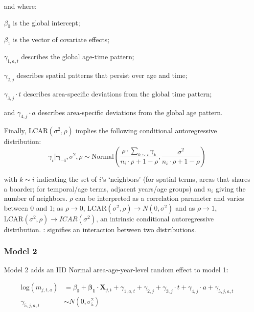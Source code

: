 \documentclass[12pt]{article}
\begin{document}
	and where:
	\begin{description}
		\setlength{\itemsep}{0pt}
		\setlength{\parskip}{0pt}
		\setlength{\parsep}{0pt}
		\setlength{\itemindent}{5pt}
		\setlength{\itemindent}{5pt}
		\item $\beta_0$ is the global intercept;
		\item $\beta_1$ is the vector of covariate effects;
		\item $\gamma_{1,a,t}$ describes the global age-time pattern;
		\item $\gamma_{2,j}$ describes spatial patterns that persist over age and time;
		\item $\gamma_{3,j} \cdot t$ describes area-specific deviations from the global time pattern;
		\item and $\gamma_{4,j} \cdot a$ describes area-specific deviations from the global age pattern.
	\end{description}

	Finally, $\text{LCAR}(\sigma^2, \rho)$ implies the following conditional autoregressive distribution:
	\begin{equation*}
		\gamma_{i} | \boldsymbol{\gamma_{-i}}, \sigma^2, \rho \sim \text{Normal} \left (\frac{\rho \cdot \sum_{k \sim i} \gamma_k}{n_i \cdot \rho+ 1 - \rho}, \frac{\sigma^2}{n_i \cdot \rho + 1 - \rho} \right )
	\end{equation*}

	with $k \sim i$ indicating the set of $i$'s `neighbors' (for spatial terms, areas that shares a boarder; for temporal/age terms, adjacent years/age groups) and $n_{i}$ giving the number of neighbors.
	$\rho$ can be interpreted as a correlation parameter and varies between 0 and 1; as $\rho \rightarrow 0$, $\text{LCAR}(\sigma^2, \rho)  \rightarrow N(0, \sigma^2)$ and as $\rho \rightarrow 1$, $\text{LCAR}(\sigma^2, \rho) \rightarrow ICAR(\sigma^2)$, an intrinsic conditional autoregressive distribution.
	: signifies an interaction between two  distributions.

\subsubsection{Model 2}
	Model 2 adds an IID Normal area-age-year-level random effect to model 1:

	\begin{align*}
		\text{log}(m_{j,t,a}) &= \beta_0 + \boldsymbol{\beta_1} \cdot \boldsymbol{X}_{j,t} + \gamma_{1,a,t} + \gamma_{2,j} + \gamma_{3,j} \cdot t + \gamma_{4,j} \cdot a + \gamma_{5,j,a,t} \\
		\gamma_{5,j,a,t} &\sim N(0, \sigma^2_5)
	\end{align*}
\end{document}
